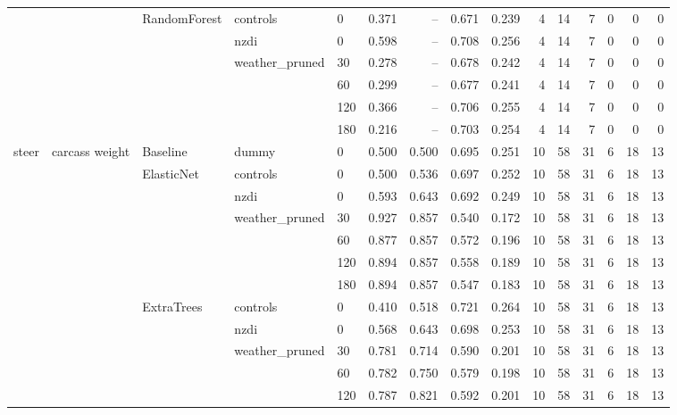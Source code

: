 \begin{longtable}{lllllrrrrrrrrrr}
\cline{3-15} \cline{4-15}
 &  & \multirow[t]{6}{*}{RandomForest} & controls & 0 & 0.371 & -- & 0.671 & 0.239 & 4 & 14 & 7 & 0 & 0 & 0 \\
\cline{4-15}
 &  &  & nzdi & 0 & 0.598 & -- & 0.708 & 0.256 & 4 & 14 & 7 & 0 & 0 & 0 \\
\cline{4-15}
 &  &  & \multirow[t]{4}{*}{weather_pruned} & 30 & 0.278 & -- & 0.678 & 0.242 & 4 & 14 & 7 & 0 & 0 & 0 \\
 &  &  &  & 60 & 0.299 & -- & 0.677 & 0.241 & 4 & 14 & 7 & 0 & 0 & 0 \\
 &  &  &  & 120 & 0.366 & -- & 0.706 & 0.255 & 4 & 14 & 7 & 0 & 0 & 0 \\
 &  &  &  & 180 & 0.216 & -- & 0.703 & 0.254 & 4 & 14 & 7 & 0 & 0 & 0 \\
\cline{1-15} \cline{2-15} \cline{3-15} \cline{4-15}
\multirow[t]{93}{*}{steer} & \multirow[t]{31}{*}{carcass weight} & Baseline & dummy & 0 & 0.500 & 0.500 & 0.695 & 0.251 & 10 & 58 & 31 & 6 & 18 & 13 \\
\cline{3-15} \cline{4-15}
 &  & \multirow[t]{6}{*}{ElasticNet} & controls & 0 & 0.500 & 0.536 & 0.697 & 0.252 & 10 & 58 & 31 & 6 & 18 & 13 \\
\cline{4-15}
 &  &  & nzdi & 0 & 0.593 & 0.643 & 0.692 & 0.249 & 10 & 58 & 31 & 6 & 18 & 13 \\
\cline{4-15}
 &  &  & \multirow[t]{4}{*}{weather_pruned} & 30 & 0.927 & 0.857 & 0.540 & 0.172 & 10 & 58 & 31 & 6 & 18 & 13 \\
 &  &  &  & 60 & 0.877 & 0.857 & 0.572 & 0.196 & 10 & 58 & 31 & 6 & 18 & 13 \\
 &  &  &  & 120 & 0.894 & 0.857 & 0.558 & 0.189 & 10 & 58 & 31 & 6 & 18 & 13 \\
 &  &  &  & 180 & 0.894 & 0.857 & 0.547 & 0.183 & 10 & 58 & 31 & 6 & 18 & 13 \\
\cline{3-15} \cline{4-15}
 &  & \multirow[t]{6}{*}{ExtraTrees} & controls & 0 & 0.410 & 0.518 & 0.721 & 0.264 & 10 & 58 & 31 & 6 & 18 & 13 \\
\cline{4-15}
 &  &  & nzdi & 0 & 0.568 & 0.643 & 0.698 & 0.253 & 10 & 58 & 31 & 6 & 18 & 13 \\
\cline{4-15}
 &  &  & \multirow[t]{4}{*}{weather_pruned} & 30 & 0.781 & 0.714 & 0.590 & 0.201 & 10 & 58 & 31 & 6 & 18 & 13 \\
 &  &  &  & 60 & 0.782 & 0.750 & 0.579 & 0.198 & 10 & 58 & 31 & 6 & 18 & 13 \\
 &  &  &  & 120 & 0.787 & 0.821 & 0.592 & 0.201 & 10 & 58 & 31 & 6 & 18 & 13 \\

\end{longtable}
